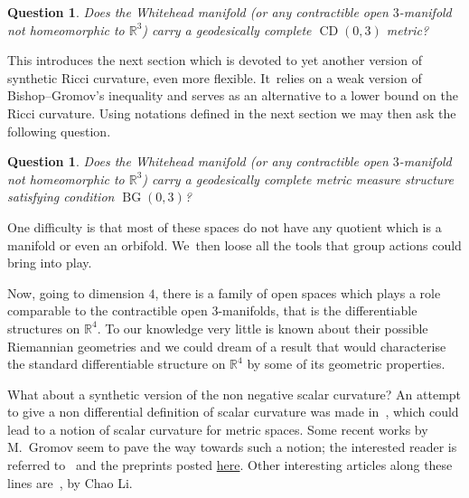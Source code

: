 \documentclass[pdftex]{sigma}
\numberwithin{equation}{section}
\newtheorem{question}[theor]{Question}
\newcommand{\CDCD}{\operatorname{CD}}
\newcommand{\BG}{\operatorname{BG}}
\begin{document}
\begin{question}
Does the Whitehead manifold (or any contractible open $3$-manifold not homeo\-morphic to $\mathbb R^3$) carry a geodesically complete $\CDCD (0, 3)$ metric?
\end{question}

This introduces the next section which is devoted to yet another version of synthetic Ricci curvature, even more flexible. It~relies on a weak version of Bishop--Gromov's inequality and serves as an alternative to a lower bound on the Ricci curvature. Using notations defined in the next section we may then ask the following question.

\begin{question}
Does the Whitehead manifold (or any contractible open $3$-manifold not homeo\-morphic to $\mathbb R^3$) carry a geodesically complete metric measure
structure satisfying condition $\BG (0, 3)$?
\end{question}

One difficulty is that most of these spaces do not have any quotient which is a manifold or even an orbifold. We~then loose all the tools that group actions could bring into play.

Now, going to dimension $4$, there is a family of open spaces which plays
a role comparable to the contractible open $3$-manifolds, that is the differentiable structures on $\mathbb R^4$. To our knowledge very little is known about their possible Riemannian geometries and we could dream of a result that would characterise the standard differentiable structure on $\mathbb R^4$ by some of its geometric properties.

What about a synthetic version of the non negative scalar curvature? An attempt to give a non differential definition of scalar curvature was made in~\cite{Vero}, which could lead to a notion of scalar curvature for metric spaces. Some recent works by M.~Gromov seem to pave the way towards such a notion; the interested reader is referred to~\cite{Misha2, Misha1}
and the preprints posted \href{https://www.ihes.fr/~gromov/category/positivescalarcurvature/}{here}. Other interesting articles along these lines are~\cite{ChaoLi2, ChaoLi1}, by Chao Li.
\end{document}
